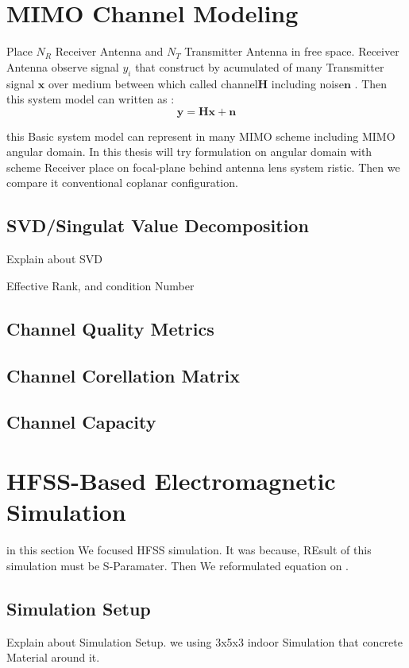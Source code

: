 \section{MIMO Channel Modeling}

Place $N_R$ Receiver Antenna and $N_T$ Transmitter Antenna in free space. Receiver Antenna observe signal $y_i$ that construct by acumulated of many Transmitter signal $\mathbf{x}$ over medium between which called channel$\mathbf{H}$ including noise$\mathbf{n}$ . Then this system model can written as :
\begin{equation}
    \mathbf{y} = \mathbf{H}\mathbf{x} + \mathbf{n}
    \label{eq:basicMimo}
\end{equation}

this Basic system model can represent in many MIMO scheme including MIMO angular domain\cite{Tse2005}\cite{Challita2022}. In this thesis will try formulation on angular domain with scheme Receiver place on focal-plane behind antenna lens system ristic. Then we compare it conventional coplanar configuration.

\subsection{SVD/Singulat Value Decomposition}
    Explain about SVD
    
    Effective Rank, and condition Number

\subsection{Channel Quality Metrics}

\subsection{Channel Corellation Matrix}


\subsection{Channel Capacity}

\section{HFSS-Based Electromagnetic Simulation}
in this section We focused HFSS simulation. It was because, REsult of this simulation must be S-Paramater. Then We reformulated equation on .

\subsection{Simulation Setup}
Explain about Simulation Setup. we using 3x5x3 indoor Simulation that concrete Material around it.

